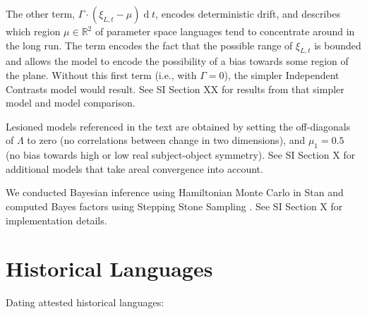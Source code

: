 \documentclass[11pt,a4paper]{article}
\begin{document}
The other term, $\Gamma \cdot (\xi_{L,t}-\mu) \operatorname{d}t$, encodes deterministic drift, and describes which region $\mu \in \mathbb{R}^2$ of parameter space languages tend to concentrate around in the long run.
The term encodes the fact that the possible range of $\xi_{L,t}$ is bounded and allows the model to encode the possibility of a bias towards some region of the plane.
Without this first term (i.e., with $\Gamma =0$), the simpler Independent Contrasts model \citep{felsenstein1973maximum,freckleton2012fast} would result. See SI Section XX for results from that simpler model and model comparison.

Lesioned models referenced in the text are obtained by setting the off-diagonals of $\Lambda$ to zero (no correlations between change in two dimensions), and $\mu_1=0.5$ (no bias towards high or low real subject-object symmetry).
See SI Section X for additional models that take areal convergence into account.

We conducted Bayesian inference using Hamiltonian Monte Carlo in Stan \citep{homan2014the,carpenter2017stan} and computed Bayes factors using Stepping Stone Sampling \citep{xie2011improving}.
See SI Section X for implementation details.







\appendix

\section{Historical Languages}


Dating attested historical languages:
\end{document}
